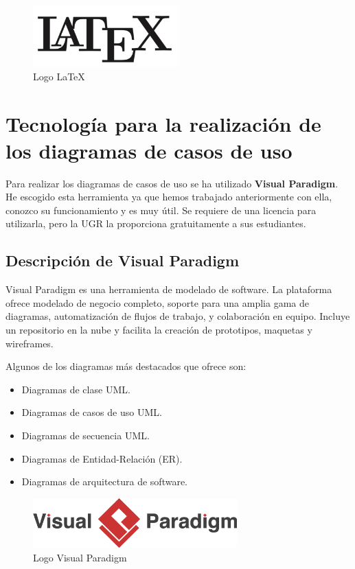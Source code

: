 \begin{figure}[H]
	\centering
	\includegraphics[width=0.5\textwidth]{imagenes/imagenesTecnologias/latex.png}
	\caption{Logo LaTeX}
\end{figure}

\section{Tecnología para la realización de los diagramas de casos de uso}

Para realizar los diagramas de casos de uso se ha utilizado \textbf{Visual Paradigm}. He escogido esta herramienta ya que hemos trabajado anteriormente con ella, conozco su funcionamiento y es muy útil. Se requiere de una licencia para utilizarla, pero la UGR la proporciona gratuitamente a sus estudiantes. 

\subsection{Descripción de Visual Paradigm}

Visual Paradigm es una herramienta de modelado de software. La plataforma ofrece modelado de negocio completo, soporte para una amplia gama de diagramas, automatización de flujos de trabajo, y colaboración en equipo. Incluye un repositorio en la nube y facilita la creación de prototipos, maquetas y wireframes. \cite{visual}

\newpage

Algunos de los diagramas más destacados que ofrece son: 

\begin{itemize}
	\item Diagramas de clase UML. 
	\item Diagramas de casos de uso UML. 
	\item Diagramas de secuencia UML. 
	\item Diagramas de Entidad-Relación (ER).
	\item Diagramas de arquitectura de software. 
\end{itemize}  

\begin{figure}[H]
	\centering
	\includegraphics[width=0.7\textwidth]{imagenes/imagenesTecnologias/Visual_Paradigm_logo.png}
	\caption{Logo Visual Paradigm}
\end{figure}



